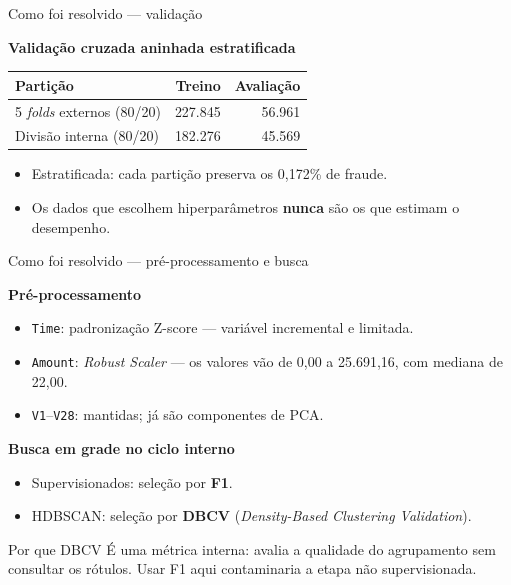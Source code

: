 \documentclass[aspectratio=169,11pt]{beamer}
\begin{document}
\begin{frame}{Como foi resolvido --- validação}

    \textbf{Validação cruzada aninhada estratificada}

    \bigskip
    \begin{center}
    \begin{tabular}{lrr}
        \toprule
        \textbf{Partição} & \textbf{Treino} & \textbf{Avaliação} \\
        \midrule
        5 \textit{folds} externos (80/20) & 227.845 & 56.961 \\
        Divisão interna (80/20)           & 182.276 & 45.569 \\
        \bottomrule
    \end{tabular}
    \end{center}

    \bigskip
    \begin{itemize}
        \item Estratificada: cada partição preserva os 0,172\% de fraude.
        \item Os dados que escolhem hiperparâmetros \textbf{nunca} são os que
              estimam o desempenho.
    \end{itemize}

\end{frame}

\begin{frame}{Como foi resolvido --- pré-processamento e busca}

    \textbf{Pré-processamento}
    \begin{itemize}
        \item \texttt{Time}: padronização Z-score --- variável incremental e
              limitada.
        \item \texttt{Amount}: \textit{Robust Scaler} --- os valores vão de
              0,00 a 25.691,16, com mediana de 22,00.
        \item \texttt{V1}--\texttt{V28}: mantidas; já são componentes de PCA.
    \end{itemize}

    \bigskip
    \textbf{Busca em grade no ciclo interno}
    \begin{itemize}
        \item Supervisionados: seleção por \textbf{F1}.
        \item HDBSCAN: seleção por \textbf{DBCV}
              (\textit{Density-Based Clustering Validation}).
    \end{itemize}

    \bigskip
    \begin{alertblock}{Por que DBCV}
        É uma métrica interna: avalia a qualidade do agrupamento sem consultar
        os rótulos. Usar F1 aqui contaminaria a etapa não supervisionada.
    \end{alertblock}

\end{frame}
\end{document}
